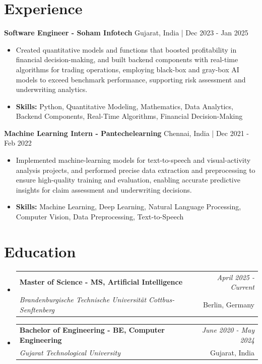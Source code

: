 \documentclass[a4paper,11pt]{article}
\makeatletter
\newcommand{\resumeSubheading}[4]{
\vspace{0.5mm}\item
    \begin{tabular*}{0.98\textwidth}[t]{l@{\extracolsep{\fill}}r}
        \textbf{#1} & \textit{\footnotesize{#4}} \\
        \textit{\footnotesize{#3}} &  \footnotesize{#2}\\
    \end{tabular*}
    \vspace{-2.4mm}
}
\makeatother
\begin{document}
\section{\textbf{Experience}}


\vspace{1mm}
  \textbf{Software Engineer - Soham Infotech} \hfill Gujarat, India | Dec 2023 - Jan 2025
\vspace{-1.5mm} %
\begin{itemize}
  \item Created quantitative models and functions that boosted profitability in financial decision-making, and built backend components with real-time algorithms for trading operations, employing black-box and gray-box AI models to exceed benchmark performance, supporting risk assessment and underwriting analytics.

\vspace{-2mm}
  \item \textbf{Skills:} Python, Quantitative Modeling, Mathematics, Data Analytics, Backend Components, Real-Time Algorithms, Financial Decision-Making
\end{itemize}

\vspace{1mm}
  \textbf{Machine Learning Intern - Pantechelearning} \hfill Chennai, India | Dec 2021 - Feb 2022
\vspace{-1.5mm} %
\begin{itemize}
  \item Implemented machine-learning models for text-to-speech and visual-activity analysis projects, and performed precise data extraction and preprocessing to ensure high-quality training and evaluation, enabling accurate predictive insights for claim assessment and underwriting decisions.
\vspace{-2mm}
  \item \textbf{Skills:} Machine Learning, Deep Learning, Natural Language Processing, Computer Vision, Data Preprocessing, Text-to-Speech
\end{itemize}\section{\textbf{Education}}
\vspace{-0.4mm}

\begin{itemize}
\resumeSubheading
{Master of Science - MS, Artificial Intelligence }{Berlin, Germany}
{Brandenburgische Technische Universität Cottbus-Senftenberg  }{April 2025 - Current}

\vspace{1.0mm} %
\resumeSubheading
{Bachelor of Engineering - BE, Computer Engineering  }{Gujarat, India}
{Gujarat Technological University }{June 2020 - May 2024}

\end{itemize}
\end{document}
